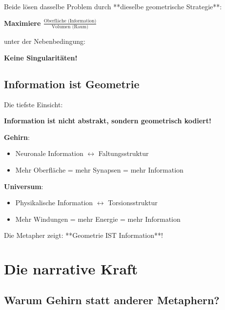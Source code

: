 	Beide lösen dasselbe Problem durch **dieselbe geometrische Strategie**:
	
	\begin{center}
		
		\textbf{Maximiere $\frac{\text{Oberfläche (Information)}}{\text{Volumen (Raum)}}$}
		
		\normalsize
		unter der Nebenbedingung:
		
		
		\textbf{Keine Singularitäten!}
	\end{center}
	
	\subsection{Information ist Geometrie}
	
	Die tiefste Einsicht:
	
	\begin{revolutionary}[Information = Geometrie]
		\textbf{Information ist nicht abstrakt, sondern geometrisch kodiert!}
		
		\vspace{0.3cm}
		
		\textbf{Gehirn}:
		\begin{itemize}
			\item Neuronale Information $\leftrightarrow$ Faltungsstruktur
			\item Mehr Oberfläche = mehr Synapsen = mehr Information
		\end{itemize}
		
		\textbf{Universum}:
		\begin{itemize}
			\item Physikalische Information $\leftrightarrow$ Torsionsstruktur
			\item Mehr Windungen = mehr Energie = mehr Information
		\end{itemize}
		
		\vspace{0.3cm}
		
		Die Metapher zeigt: **Geometrie IST Information**!
	\end{revolutionary}
	
	\section{Die narrative Kraft}
	
	\subsection{Warum Gehirn statt anderer Metaphern?}
	
